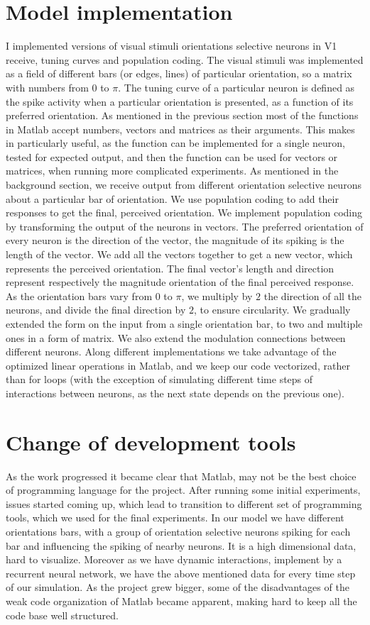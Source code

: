 \section{Model implementation}
I implemented versions of visual stimuli orientations selective neurons in V1 receive, tuning curves and population coding. The visual stimuli was implemented as a field of different bars (or edges, lines) of particular orientation, so a matrix with numbers from $0$ to $\pi$. The tuning curve of a particular neuron is defined as the spike activity when a particular orientation is presented, as a function of its preferred orientation. As mentioned in the previous section most of the functions in Matlab accept numbers, vectors and matrices as their arguments. This makes in particularly useful, as the function can be implemented for a single neuron, tested for expected output, and then the function can be used for vectors or matrices, when running more complicated experiments. As mentioned in the background section, we receive output from different orientation selective neurons  about a particular bar of orientation. We use population coding to add their responses to get the final, perceived orientation. We implement population coding by transforming the output of the neurons in vectors. The preferred orientation of every neuron is the direction of the vector, the magnitude of its spiking is the length of the vector. We add all the vectors together to get a new vector, which represents the perceived orientation. The final vector's length and direction represent respectively the magnitude orientation of the final perceived response. As the orientation bars vary from $0$ to $\pi$, we multiply by $2$ the direction of all the neurons, and divide the final direction by $2$, to ensure circularity.
We gradually extended the form on the input from a single orientation bar, to two and multiple ones in a form of matrix. We also extend the modulation connections between different neurons. Along different implementations we take advantage of the optimized linear operations in Matlab, and we keep our code vectorized, rather than for loops (with the exception of simulating different time steps of interactions between neurons, as the next state depends on the previous one).

\section{Change of development tools}
As the work progressed it became clear that Matlab, may not be the best choice of programming language for the project. After running some initial experiments, issues started coming up, which lead to transition to different set of programming tools, which we used for the final experiments. In our model we have different orientations bars, with a group of orientation selective neurons spiking for each bar and influencing the spiking of nearby neurons. It is a high dimensional data, hard to visualize. Moreover as we have dynamic interactions, implement by a recurrent neural network, we have the above mentioned data for every time step of our simulation. As the project grew bigger, some of the disadvantages of the weak code organization of Matlab became apparent, making hard to keep all the code base well structured.

